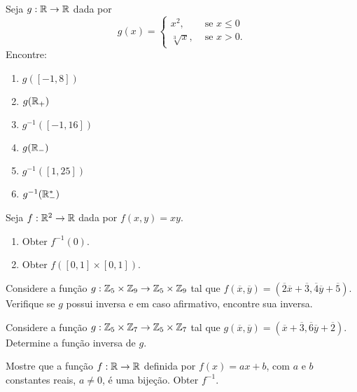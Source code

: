 \documentclass[12pt]{exam}
\begin{document}
\vspace{.3cm}

\questao{} Seja $g : \mathbb{R} \to \mathbb{R}$ dada por
\[
    g(x) = \begin{cases}
        x^2,& \mbox{ se } x \le 0\\
        \sqrt[3]{x}, & \mbox{ se } x > 0.
    \end{cases}
\]
Encontre:
\begin{multicols}{2}
    \begin{enumerate}[label={\alph*})]
        \item $g([-1,8])$
        \item $g(\mathbb{R}_+)$
        \item $g^{-1}([-1,16])$
        \item $g(\mathbb{R}_-)$
        \item $g^{-1}([1,25])$
        \item $g^{-1}(\mathbb{R}^*_-)$
    \end{enumerate} 
\end{multicols}

\vspace{.3cm}

\questao{} Seja $f: \mathbb{R}^2 \to \mathbb{R}$ dada por $f(x,y) = xy$.
\begin{enumerate}[label={\alph*})]
    \item Obter $f^{-1}({0})$.
    \item Obter $f([0,1]\times [0,1])$.
\end{enumerate}

\vspace{.3cm}


\questao{} Considere a fun{\c c}{\~a}o $g : \mathbb{Z}_5 \times \mathbb{Z}_9 \to \mathbb{Z}_5 \times \mathbb{Z}_9$ tal que $f(\overline{x},\overline{y}) = (\overline{2} \overline{x} + \overline{3}, \overline{4}\overline{y} + \overline{5})$. Verifique se $g$ possui inversa e em caso afirmativo, encontre sua inversa.

\vspace{.3cm}

\questao{} Considere a fun{\c c}{\~a}o $g : \mathbb{Z}_5 \times \mathbb{Z}_7 \to \mathbb{Z}_5 \times \mathbb{Z}_7$ tal que $g(\overline{x},\overline{y}) = (\overline{x} + \overline{3}, \overline{6}\overline{y} + \overline{2})$. Determine a fun\c{c}\~ao inversa de $g$.

\vspace{.3cm}

\questao{} Mostre que a fun{\c c}{\~a}o $f : \mathbb{R} \to \mathbb{R}$ definida por $f(x) = ax + b$, com $a$ e $b$ constantes reais, $a \ne 0$, {\'e} uma bije{\c c}{\~a}o. Obter $f^{-1}$.
\end{document}
